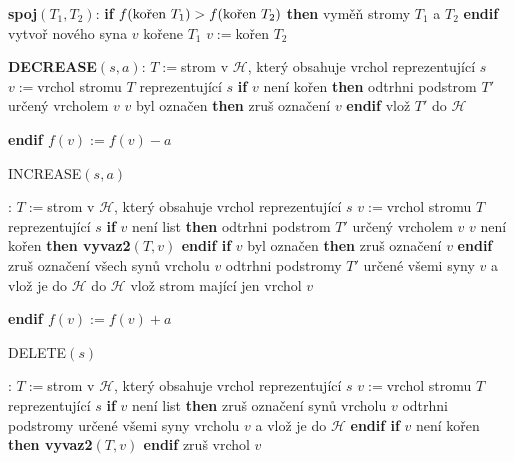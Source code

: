 \documentclass[a4paper,12pt]{article}
\begin{document}
{\bf spoj$(T_1,T_2)$}:\newline 
{\bf if} $f(\text{\rm kořen }T_1)>f(\text{\rm kořen }T_2)$ {\bf then\newline 
\phantom{{\rm{\rm ---}}}}vyměň stromy $T_1$ a $T_2$\newline 
{\bf endif\newline }
vytvoř nového syna $v$ kořene $T_1$\newline 
$v:=$kořen $T_2$

{\bf DECREASE$(s,a)$}:\newline 
$T:=$strom v $\mathcal H$, který obsahuje vrchol reprezentující $
s$\newline 
$v:=$vrchol stromu $T$ reprezentující $s$\newline 
{\bf if} $v$ není kořen {\bf then \newline 
\phantom{{\rm ---}}}odtrhni podstrom $T'$ určený vrcholem $v$\newline 
{} $v$ byl označen {\bf then} zruš označení $
v$ {\bf endif\newline 
\phantom{{\rm ---}}}vlož $T'$ do $\mathcal H$\newline 
{\bf endif\newline 
$f(v):=f(v)-a$

INCREASE$(s,a)$}:\newline 
$T:=$strom v $\mathcal H$, který obsahuje vrchol reprezentující $
s$\newline 
$v:=$vrchol stromu $T$ reprezentující $s$\newline 
{\bf if} $v$ není list {\bf then \newline 
\phantom{{\rm ---}}}odtrhni podstrom $T'$ určený vrcholem $v$\newline 
\phantom{---}{\bf if} $v$ není kořen {\bf then vyvaz2$(T,v
)$ endif\newline 
\phantom{{\rm ---}}if} $v$ byl označen {\bf then} zruš označení $
v$ {\bf endif\newline 
\phantom{{\rm ---}}}zruš označení všech synů vrcholu $
v$\newline 
\phantom{---}odtrhni podstromy $T'$ určené všemi syny $v$ 
a vlož je do $\mathcal H$\newline 
\phantom{{\bf ---}}do $\mathcal H$ vlož strom mající jen vrchol $
v$\newline 
{\bf endif\newline 
$f(v):=f(v)+a$

DELETE$(s)$}:\newline 
$T:=$strom v $\mathcal H$, který obsahuje vrchol reprezentující $
s$\newline 
$v:=$vrchol stromu $T$ reprezentující $s$\newline 
{\bf if} $v$ není list {\bf then\newline 
\phantom{{\rm ---}}}zruš označení synů vrcholu $
v$\newline 
\phantom{---}odtrhni podstromy určené všemi syny 
vrcholu $v$ a vlož je do $\mathcal H$\newline 
{\bf endif\newline 
if} $v$ není kořen {\bf then vyvaz2$(T,v)$ endif\newline }
zruš vrchol $v$
\end{document}
